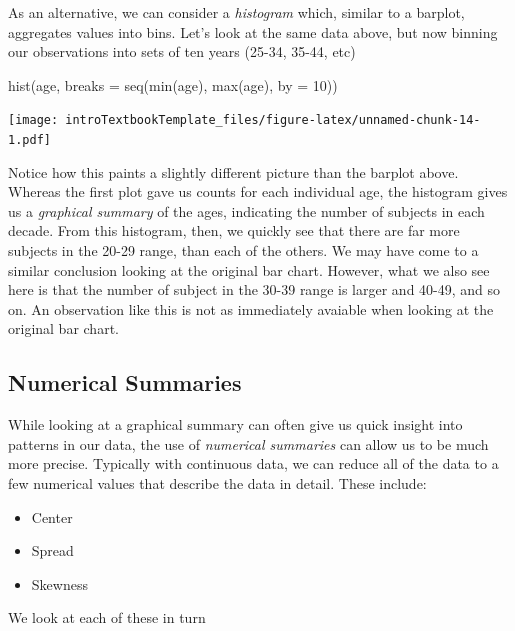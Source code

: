 \documentclass[
]{book}
\newenvironment{Shaded}{\begin{snugshade}}{\end{snugshade}}
\newcommand{\AttributeTok}[1]{\textcolor[rgb]{0.77,0.63,0.00}{#1}}
\newcommand{\DecValTok}[1]{\textcolor[rgb]{0.00,0.00,0.81}{#1}}
\newcommand{\FunctionTok}[1]{\textcolor[rgb]{0.00,0.00,0.00}{#1}}
\newcommand{\NormalTok}[1]{#1}
\providecommand{\tightlist}{%
  \setlength{\itemsep}{0pt}\setlength{\parskip}{0pt}}
\theoremstyle{definition}
\theoremstyle{definition}
\theoremstyle{definition}
\theoremstyle{remark}
\begin{document}
As an alternative, we can consider a \emph{histogram} which, similar to a barplot, aggregates values into bins. Let's look at the same data above, but now binning our observations into sets of ten years (25-34, 35-44, etc)

\begin{Shaded}
\begin{Highlighting}[]
\FunctionTok{hist}\NormalTok{(age, }\AttributeTok{breaks =} \FunctionTok{seq}\NormalTok{(}\FunctionTok{min}\NormalTok{(age), }\FunctionTok{max}\NormalTok{(age), }\AttributeTok{by =} \DecValTok{10}\NormalTok{))}
\end{Highlighting}
\end{Shaded}

\texttt{[image: introTextbookTemplate\_files/figure-latex/unnamed-chunk-14-1.pdf]}

Notice how this paints a slightly different picture than the barplot above. Whereas the first plot gave us counts for each individual age, the histogram gives us a \emph{graphical summary} of the ages, indicating the number of subjects in each decade. From this histogram, then, we quickly see that there are far more subjects in the 20-29 range, than each of the others. We may have come to a similar conclusion looking at the original bar chart. However, what we also see here is that the number of subject in the 30-39 range is larger and 40-49, and so on. An observation like this is not as immediately avaiable when looking at the original bar chart.

\hypertarget{numerical-summaries}{%
\subsection{Numerical Summaries}\label{numerical-summaries}}

While looking at a graphical summary can often give us quick insight into patterns in our data, the use of \emph{numerical summaries} can allow us to be much more precise. Typically with continuous data, we can reduce all of the data to a few numerical values that describe the data in detail. These include:

\begin{itemize}
\tightlist
\item
  Center
\item
  Spread
\item
  Skewness
\end{itemize}

We look at each of these in turn
\end{document}
